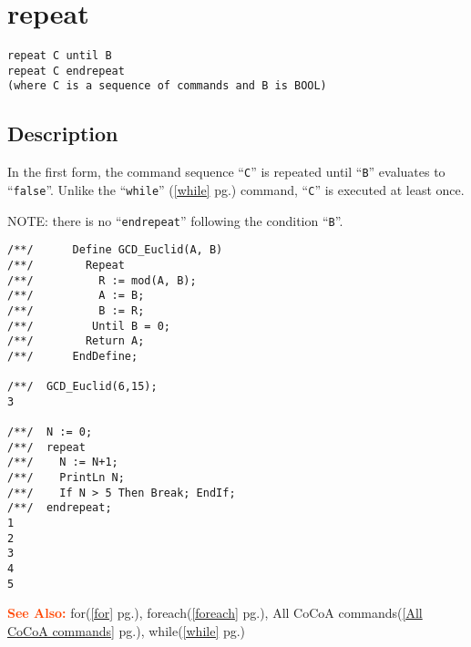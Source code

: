 \documentclass[a4paper]{mybook}
\newenvironment{command}{}{} %
\newcommand\SeeAlso{\par\textcolor{OrangeRed}{\textbf{\large See Also: }}}
\begin{document}
\section{repeat}
\label{repeat}
\begin{command} %


\begin{Verbatim}[label=syntax, rulecolor=\color{MidnightBlue},
frame=single]
repeat C until B
repeat C endrepeat
(where C is a sequence of commands and B is BOOL)
\end{Verbatim}


\subsection*{Description}

In the first form, the command sequence ``\verb&C&'' is repeated until ``\verb&B&''
evaluates to ``\verb&false&''.
Unlike the ``\verb&while&'' (\ref{while} pg.\pageref{while}) command, ``\verb&C&'' is executed at least once.
\par 
NOTE: there is no ``\verb&endrepeat&'' following the condition ``\verb&B&''.
\begin{Verbatim}[label=example, rulecolor=\color{PineGreen}, frame=single]
/**/      Define GCD_Euclid(A, B)
/**/        Repeat
/**/          R := mod(A, B);
/**/          A := B;
/**/          B := R;
/**/         Until B = 0;
/**/        Return A;
/**/      EndDefine;

/**/  GCD_Euclid(6,15);
3

/**/  N := 0;
/**/  repeat
/**/    N := N+1;
/**/    PrintLn N;
/**/    If N > 5 Then Break; EndIf;
/**/  endrepeat;
1
2
3
4
5
\end{Verbatim}


\SeeAlso %
  for(\ref{for} pg.\pageref{for}), 
    foreach(\ref{foreach} pg.\pageref{foreach}), 
    All CoCoA commands(\ref{All CoCoA commands} pg.\pageref{All CoCoA commands}), 
    while(\ref{while} pg.\pageref{while})
\end{command} %
\end{document}
